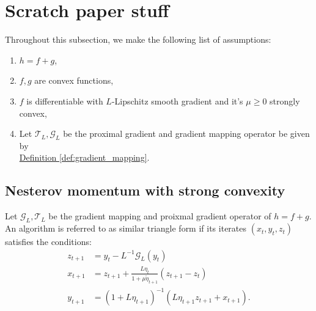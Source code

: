 \documentclass[12pt]{article}
\begin{document}

\appendix
\section{Scratch paper stuff}
    Throughout this subsection, we make the following list of assumptions: 
    \begin{enumerate}
        \item $h = f + g$, 
        \item $f, g$ are convex functions, 
        \item $f$ is differentiable with $L$-Lipschitz smooth gradient and it's $\mu \ge 0$ strongly convex,
        \item Let $\mathcal T_L, \mathcal G_L$ be the proximal gradient and gradient mapping operator be given by \\
        \hyperref[def:gradient_mapping]{Definition \ref*{def:gradient_mapping}}. 
    \end{enumerate}

    \subsection{Nesterov momentum with strong convexity}
        
        \begin{definition}\label{def:s-cvx_similar_triangle_form}
            Let $\mathcal G_L, \mathcal T_L$ be the gradient mapping and proixmal gradient operator of $h = f + g$. 
            An algorithm is referred to as similar triangle form if its iterates $(x_t, y_t, z_t)$ satisfies the conditions: 
            \begin{align*}
                z_{t + 1} &= 
                y_t - L^{-1}\mathcal G_L(y_t)
                \\
                x_{t + 1}&= 
                z_{t + 1} + \frac{L\eta_t}{1 + \mu\tilde \eta_{t + 1}}(z_{t + 1} - z_t)
                \\
                y_{t + 1}&= 
                (1 + L\eta_{t + 1})^{-1} (L\eta_{t + 1}z_{t + 1} + x_{t + 1}). 
            \end{align*}
        \end{definition}
\end{document}
